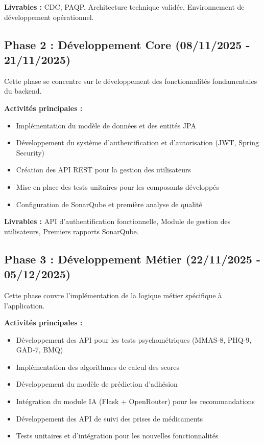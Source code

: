 \documentclass[12pt,a4paper]{report}
\begin{document}
\textbf{Livrables :} CDC, PAQP, Architecture technique validée, Environnement de développement opérationnel.

\subsection{Phase 2 : Développement Core (08/11/2025 - 21/11/2025)}

Cette phase se concentre sur le développement des fonctionnalités fondamentales du backend.

\textbf{Activités principales :}
\begin{itemize}
    \item Implémentation du modèle de données et des entités JPA
    \item Développement du système d'authentification et d'autorisation (JWT, Spring Security)
    \item Création des API REST pour la gestion des utilisateurs
    \item Mise en place des tests unitaires pour les composants développés
    \item Configuration de SonarQube et première analyse de qualité
\end{itemize}

\textbf{Livrables :} API d'authentification fonctionnelle, Module de gestion des utilisateurs, Premiers rapports SonarQube.

\subsection{Phase 3 : Développement Métier (22/11/2025 - 05/12/2025)}

Cette phase couvre l'implémentation de la logique métier spécifique à l'application.

\textbf{Activités principales :}
\begin{itemize}
    \item Développement des API pour les tests psychométriques (MMAS-8, PHQ-9, GAD-7, BMQ)
    \item Implémentation des algorithmes de calcul des scores
    \item Développement du modèle de prédiction d'adhésion
    \item Intégration du module IA (Flask + OpenRouter) pour les recommandations
    \item Développement des API de suivi des prises de médicaments
    \item Tests unitaires et d'intégration pour les nouvelles fonctionnalités
\end{itemize}
\end{document}
